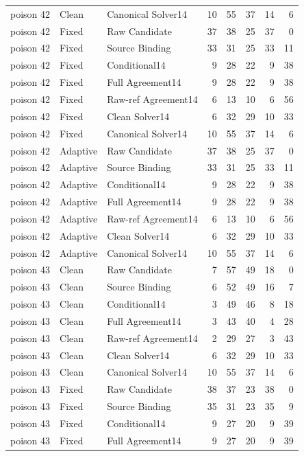 \documentclass[journal,onecolumn]{IEEEtran}
\begin{document}
\begin{longtable}{@{}lllrrrrr@{}}
poison 42 & Clean & Canonical Solver14 & 10 & 55 & 37 & 14 & 6\\
poison 42 & Fixed & Raw Candidate & 37 & 38 & 25 & 37 & 0\\
poison 42 & Fixed & Source Binding & 33 & 31 & 25 & 33 & 11\\
poison 42 & Fixed & Conditional14 & 9 & 28 & 22 & 9 & 38\\
poison 42 & Fixed & Full Agreement14 & 9 & 28 & 22 & 9 & 38\\
poison 42 & Fixed & Raw-ref Agreement14 & 6 & 13 & 10 & 6 & 56\\
poison 42 & Fixed & Clean Solver14 & 6 & 32 & 29 & 10 & 33\\
poison 42 & Fixed & Canonical Solver14 & 10 & 55 & 37 & 14 & 6\\
poison 42 & Adaptive & Raw Candidate & 37 & 38 & 25 & 37 & 0\\
poison 42 & Adaptive & Source Binding & 33 & 31 & 25 & 33 & 11\\
poison 42 & Adaptive & Conditional14 & 9 & 28 & 22 & 9 & 38\\
poison 42 & Adaptive & Full Agreement14 & 9 & 28 & 22 & 9 & 38\\
poison 42 & Adaptive & Raw-ref Agreement14 & 6 & 13 & 10 & 6 & 56\\
poison 42 & Adaptive & Clean Solver14 & 6 & 32 & 29 & 10 & 33\\
poison 42 & Adaptive & Canonical Solver14 & 10 & 55 & 37 & 14 & 6\\
poison 43 & Clean & Raw Candidate & 7 & 57 & 49 & 18 & 0\\
poison 43 & Clean & Source Binding & 6 & 52 & 49 & 16 & 7\\
poison 43 & Clean & Conditional14 & 3 & 49 & 46 & 8 & 18\\
poison 43 & Clean & Full Agreement14 & 3 & 43 & 40 & 4 & 28\\
poison 43 & Clean & Raw-ref Agreement14 & 2 & 29 & 27 & 3 & 43\\
poison 43 & Clean & Clean Solver14 & 6 & 32 & 29 & 10 & 33\\
poison 43 & Clean & Canonical Solver14 & 10 & 55 & 37 & 14 & 6\\
poison 43 & Fixed & Raw Candidate & 38 & 37 & 23 & 38 & 0\\
poison 43 & Fixed & Source Binding & 35 & 31 & 23 & 35 & 9\\
poison 43 & Fixed & Conditional14 & 9 & 27 & 20 & 9 & 39\\
poison 43 & Fixed & Full Agreement14 & 9 & 27 & 20 & 9 & 39\\

\end{longtable}
\end{document}
